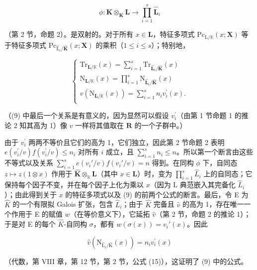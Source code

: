 \[
\phi \colon \hat {\mathbf {K}} \otimes_ {\mathbf {K}} \mathbf {L} \rightarrow \prod_ {i = 1} ^ {s} \hat {\mathbf {L}} _ {i}
\]

（第 2 节，命题 2）。是双射的。对于所有 \(x \in \mathbf{L}\)，特征多项式 \(\mathrm{Pc}_{\mathrm{L} / \mathbb{K}}(x; \mathbf{X})\) 等于特征多项式 \(\mathrm{Pc}_{\hat{\mathrm{L}}_i / \hat{\mathbf{K}}}(x; \mathbf{X})\) 的乘积（\(1 \leqslant i \leqslant s\)）；特别地，

\[
\left\{ \begin{array} { l } \mathrm{Tr} _ { \mathbf { L } / \mathbb { K } } ( x ) = \sum _ { i = 1 } ^ { s } \mathrm{Tr} _ { \hat { \mathbf { L } } _ { i } / \hat { \mathbf { K } } } ( x ) \\ \mathrm{N} _ { \mathbf { L } / \mathbb { K } } ( x ) = \prod _ { i = 1 } ^ { s } \mathrm{N} _ { \hat { \mathbf { L } } _ { i } / \hat { \mathbf { K } } } ( x ) \\ v ( \mathrm{N} _ { \mathbf { L } / \mathbb { K } } ( x ) ) = \sum _ { i = 1 } ^ { s } n _ { i } v _ { i } ^ { \prime } ( x ) . \\ \end{array} \right.\tag{9}
\]

（(9) 中最后一个关系是有意义的，因为显然可以假设 \(v_{i}^{\prime}\)（由第 1 节命题 1 的推论 2 知其高为 1）像 \(v\) 一样将其值取在 \(\mathbf{R}\) 的一个子群中。）

由于 \(v_{i}^{\prime}\) 两两不等价且它们的高为 1，它们独立，因此第 2 节命题 2 表明 \(e(v_{i}^{\prime}/v)f(v_{i}^{\prime}/v) \leqslant n_{i}\) 对所有 \(i\) 成立，且 \(\sum_{i=1}^{s} n_i \leqslant n\)。所以第一个断言由这些不等式以及关系 \(\sum_{i=1}^{s} e(v_i'/v) f(v_i'/v) = n\) 得到。在同构 \(\phi\) 下，自同态 \(z \mapsto z(1 \otimes x)\) 作用于 \(\hat{\mathbf{K}} \otimes_{\mathbb{K}} \mathbf{L}\)（其中 \(x \in \mathbf{L}\)）时，变为 \(\prod_{i=1}^{s}\hat{L}_i\) 上的自同态；它保持每个因子不变，并在每个因子上化为乘以 \(x\)（因为 L 典范嵌入其完备化 \(\hat{L}_i\)）；由此得到关于 \(x\) 的特征多项式以及 (9) 的前两个公式的断言。最后，令 E 为 \(\hat{K}\) 的一个有限拟 Galois 扩张，包含 \(\hat{L}_i\)；由于 \(\hat{K}\) 完备且 \(\hat{v}\) 的高为 1，存在唯一一个作用于 E 的赋值 \(w\)（在等价意义下），它延拓 \(\hat{v}\)（第 2 节，命题 2 的推论 1）；于是对 E 的每个 \(\hat{K}\)-自同构 \(\sigma\)，都有 \(w(\sigma(x)) = v_i'(x)\)。因此

\[
\hat {v} \left(\mathrm{N} _ {\hat {\mathrm{L}} _ {i} / \hat {\mathrm{K}}} (x)\right) = n _ {i} v _ {i} ^ {\prime} (x)
\]

（代数，第 VIII 章，第 12 节，第 2 节，公式 (15)），这证明了 (9) 中的公式。

